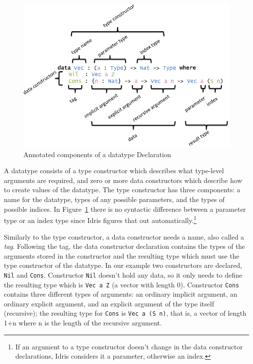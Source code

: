 \documentclass{ituthesis}
\newcommand{\ttconstructor}[1]{\textcolor{constructor-color}{\texttt{#1}}}
\newcommand{\tttype}[1]{\textcolor{type-color}{\texttt{#1}}}
\newcommand{\ttvar}[1]{\textcolor{local-var-color}{\texttt{#1}}}
\begin{document}
\begin{figure}[ht]
\begin{center}
    \includegraphics[scale=0.5]{Figures/AnatomyOfADatatype.png}
\end{center}
\caption{Annotated components of a datatype Declaration}
\label{fig:anatomydatatype}
\end{figure}

A datatype consists of a type constructor which describes what type-level arguments are required, and zero or more data constructors which describe how to create values of the datatype.
The type constructor has three components: a name for the datatype, types of any possible parameters, and the types of possible indices.
In Figure~\ref{fig:anatomydatatype} there is no syntactic difference between a parameter type or an index type since Idris figures that out automatically.\footnote{If an argument to a type constructor doesn't change in the data constructor declarations, Idris considers it a parameter, otherwise an index.}

Similarly to the type constructor, a data constructor needs a name, also called a \textit{tag}.
Following the tag, the data constructor declaration contains the types of the arguments stored in the constructor and the resulting type which must use the type constructor of the datatype.
In our example two constructors are declared, \ttconstructor{Nil} and \ttconstructor{Cons}.
Constructor \ttconstructor{Nil} doesn't hold any data, so it only needs to define the resulting type which is \tttype{Vec}~\ttvar{a}~\ttconstructor{Z} (a vector with length 0).
Constructor \ttconstructor{Cons} contains three different types of arguments: an ordinary implicit argument, an ordinary explicit argument, and an explicit argument of the type itself (recursive); the resulting type for \ttconstructor{Cons} is \tttype{Vec}~\ttvar{a}~\texttt{(}\ttconstructor{S}~\ttvar{n}\texttt{)}, that is, a vector of length 1+n where n is the length of the recursive argument.
\end{document}
